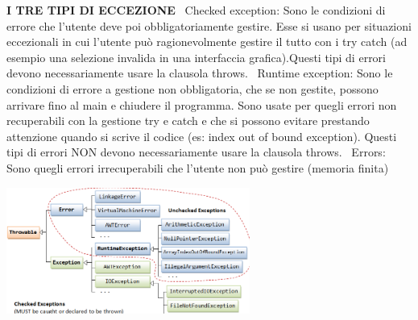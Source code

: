 \noindent \textbf{I TRE TIPI DI ECCEZIONE} \newline
\textbullet\ Checked exception: Sono le condizioni di errore che l'utente deve poi obbligatoriamente gestire. Esse si usano per situazioni eccezionali in cui l'utente può ragionevolmente gestire il tutto con i try catch (ad esempio una selezione invalida in una interfaccia grafica).Questi tipi di errori devono necessariamente usare la clausola throws. \newline
\textbullet\ Runtime exception: Sono le condizioni di errore a gestione non obbligatoria, che se non gestite, possono arrivare fino al main e chiudere il programma. Sono usate per quegli errori non recuperabili con la gestione try e catch e che si possono evitare prestando attenzione quando si scrive il codice (es: index out of bound exception). Questi tipi di errori NON devono necessariamente usare la clausola throws.\newline
\textbullet\ Errors: Sono quegli errori irrecuperabili che l'utente non può gestire (memoria finita) \newline

\begin{center}
\includegraphics[width=%
0.6\textwidth]{eccezioni}
\end{center} 
\newpage






